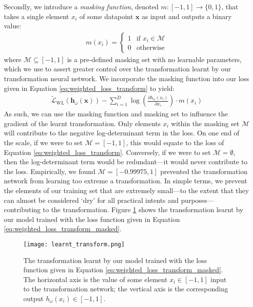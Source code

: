 \documentclass[ oneside,%
                    author={George Herbert},
                    degree={MSci},
                     title={Video Diffusion Models for Climate Simulations},
                  subtitle={}]{dissertation}
\begin{document}
Secondly, we introduce a \textit{masking function}, denoted $m:[-1,1]\to \{0,1\}$, that takes a single element $x_i$ of some datapoint $\mathbf{x}$ as input and outputs a binary value:
\begin{align}
      m(x_i)=\begin{cases}
            1 & \text{if } x_i\in \mathcal{M}\\
            0 & \text{otherwise}
      \end{cases}
\end{align}
where $\mathcal{M}\subseteq[-1, 1]$ is a pre-defined masking set with no learnable parameters, which we use to assert greater control over the transformation learnt by our transformation neural network. We incorporate the masking function into our loss given in Equation \ref{eq:weighted_loss_transform} to yield:
\begin{align}
      \tilde{\mathcal{L}}_{\mathrm{WL}}(\mathbf{h}_\omega(\mathbf{x})) - \sum_{i=1}^D \log \left(\frac{\partial h_\omega(x_i)}{\partial x_i}\right)\cdot m(x_i)\label{eq:weighted_loss_transform_masked}
\end{align}
As such, we can use the masking function and masking set to influence the gradient of the learnt transformation. Only elements $x_i$ within the masking set $\mathcal{M}$ will contribute to the negative log-determinant term in the loss. On one end of the scale, if we were to set $\mathcal{M}=[-1,1]$, this would equate to the loss of Equation \ref{eq:weighted_loss_transform}. Conversely, if we were to set $\mathcal{M}=\emptyset$, then the log-determinant term would be redundant---it would never contribute to the loss. Empirically, we found $\mathcal{M}=[-0.99975, 1]$ prevented the transformation network from learning too extreme a transformation. In simple terms, we prevent the elements of our training set that are extremely small---to the extent that they can almost be considered `dry' for all practical intents and purposes---contributing to the transformation. Figure \ref{fig:learnt_transform} shows the transformation learnt by our model trained with the loss function given in Equation \ref{eq:weighted_loss_transform_masked}.

\begin{figure}[htbp]
      \centering
      \texttt{[image: learnt\_transform.png]}
      \caption{The transformation learnt by our model trained with the loss function given in Equation \ref{eq:weighted_loss_transform_masked}. The horizontal axis is the value of some element $x_i\in[-1, 1]$ input to the transformation network; the vertical axis is the corresponding output $h_\omega(x_i)\in [-1, 1]$.}
      \label{fig:learnt_transform}
\end{figure}
\end{document}
